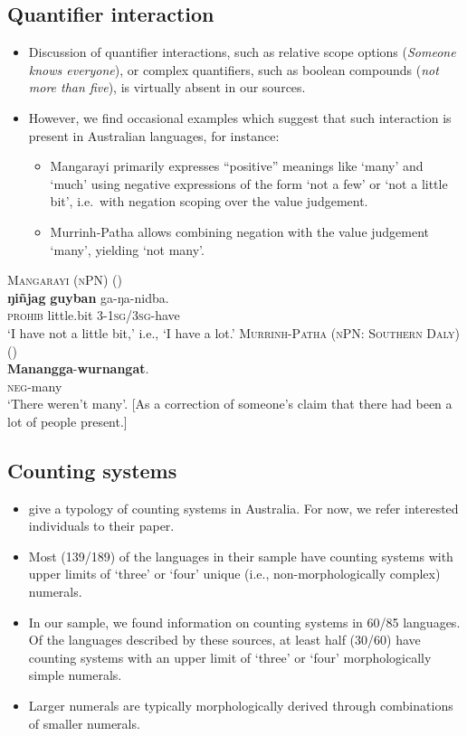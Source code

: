\documentclass{article}
\begin{document}
\subsection{Quantifier interaction}
\begin{itemize}
\item Discussion of quantifier interactions, such as relative scope options (\textit{Someone knows everyone}), or complex quantifiers, such as boolean compounds (\textit{not more than five}), is virtually absent in our sources.
\item However, we find occasional examples which suggest that such interaction is present in Australian languages, for instance:
  \begin{itemize}
  \item Mangarayi primarily expresses ``positive'' meanings like `many' and `much' using negative expressions of the form `not a few' or `not a little bit', i.e.\ with negation scoping over the value judgement.
  \item Murrinh-Patha allows combining negation with the value judgement `many', yielding `not many'.
  \end{itemize}
\end{itemize}
\begin{exe}
  \ex \textsc{Mangarayi (nPN)} (\citealt[37--38]{merlan89}) \\
  \gll \textbf{ŋi\~{n}jag} \textbf{guyban} ga-ŋa-nidba.\\
  \textsc{prohib} little.bit 3-1\textsc{sg}/3\textsc{sg}-have\\
  \glt `I have not a little bit,' i.e., `I have a lot.'
  \ex \textsc{Murrinh-Patha (nPN: Southern Daly)} (\citealt[107]{blythe09})\\
  \gll \textbf{Manangga}-\textbf{wurnangat}.\\
  \textsc{neg}-many\\
  \glt `There weren't many'. [As a correction of someone's claim that there had been a lot of people present.]
\end{exe}

\subsection{Counting systems \label{countingsystemsection}}
\begin{itemize}
\item  \cite{bowernzentz12} give a typology of counting systems in Australia. For now, we refer interested individuals to their paper.
\item Most (139/189) of the languages in their sample have counting systems with upper limits of `three' or `four' unique (i.e., non-morphologically complex) numerals.
\item In our sample, we found information on counting systems in 60/85 languages. Of the languages described by these sources, at least half (30/60) have counting systems with an upper limit of `three' or `four' morphologically simple numerals.
\item Larger numerals are typically morphologically derived through combinations of smaller numerals.
\end{itemize}
\end{document}
